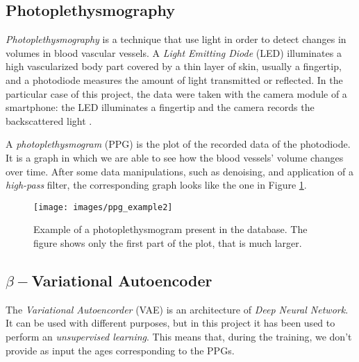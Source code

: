 \documentclass[12pt,a4paper,twocolumn]{article}
\begin{document}
	\subsection{Photoplethysmography}
		\label{ppg_intro}
		\emph{Photoplethysmography} is a technique that use light in order to detect changes in volumes in blood vascular vessels. A \emph{Light Emitting Diode} (LED) illuminates a high vascularized body part covered by a thin layer of skin, usually a fingertip, and a photodiode measures the amount of light transmitted or reflected. In the particular case of this project, the data were taken with the camera module of a smartphone: the LED illuminates a fingertip and the camera records the backscattered light \cite{Matsumura2015}.
		 
		A \emph{photoplethysmogram} (PPG) is the plot of the recorded data of the photodiode. It is a graph in which we are able to see how  the blood vessels' volume changes over time. After some data manipulations, such as denoising, and application of a \emph{high-pass} filter, the corresponding graph looks like the one in Figure \ref{fig:ppgexample}.
		\begin{figure}[h!]
			\centering
			\texttt{[image: images/ppg\_example2]}
			\caption{Example of a photoplethysmogram present in the database. The figure shows only the first part of the plot, that is much larger.}
			\label{fig:ppgexample}
		\end{figure}
		\subsection{$\beta-$Variational Autoencoder}
		\label{vae:intro}
		The	\emph{Variational Autoencorder} (VAE)  \cite{vae_paper} is an architecture of \emph{Deep Neural Network}. It can be used with different purposes, but in this project it has been used to perform an  \emph{unsupervised learning}. This means that, during the training, we don't provide as input the ages corresponding to the PPGs.
		
\end{document}
